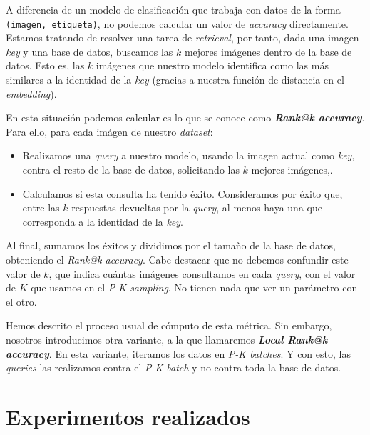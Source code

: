 A diferencia de un modelo de clasificación que trabaja con datos de la forma \lstinline{(imagen, etiqueta)}, no podemos calcular un valor de \textit{accuracy} directamente. Estamos tratando de resolver una tarea de \textit{retrieval}, por tanto, dada una imagen \textit{key} y una base de datos, buscamos las $k$  mejores imágenes dentro de la base de datos. Esto es, las $k$ imágenes que nuestro modelo identifica como las más similares a la identidad de la \textit{key} (gracias a nuestra función de distancia en el \textit{embedding}).

En esta situación podemos calcular es lo que se conoce como \textbf{\textit{Rank@k accuracy}}. Para ello, para cada imágen de nuestro \textit{dataset}:

\begin{itemize}
    \item Realizamos una \textit{query} a nuestro modelo, usando la imagen actual como \textit{key}, contra el resto de la base de datos, solicitando las $k$ mejores imágenes,.
    \item Calculamos si esta consulta ha tenido éxito. Consideramos por éxito que, entre las $k$ respuestas devueltas por la \textit{query}, al menos haya una que corresponda a la identidad de la \textit{key}.
\end{itemize}

Al final, sumamos los éxitos y dividimos por el tamaño de la base de datos, obteniendo el \textit{Rank@k accuracy}. Cabe destacar que no debemos confundir este valor de $k$, que indica cuántas imágenes consultamos en cada \textit{query}, con el valor de $K$ que usamos en el \textit{P-K sampling}. No tienen nada que ver un parámetro con el otro.

Hemos descrito el proceso usual de cómputo de esta métrica. Sin embargo, nosotros introducimos otra variante, a la que llamaremos \textbf{\textit{Local Rank@k accuracy}}. En esta variante, iteramos los datos en \textit{P-K batches}. Y con esto, las \textit{queries} las realizamos contra el \textit{P-K batch} y no contra toda la base de datos.


\section{Experimentos realizados} \label{isec:experimentos_realizados}

